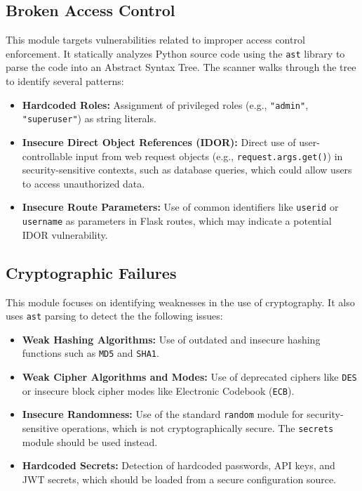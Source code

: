 \subsection{Broken Access Control}
This module targets vulnerabilities related to improper access control enforcement. It statically analyzes Python source code using the \texttt{ast} library to parse the code into an Abstract Syntax Tree. The scanner walks through the tree to identify several patterns:
\begin{itemize}
    \item \textbf{Hardcoded Roles:} Assignment of privileged roles (e.g., \texttt{"admin"}, \texttt{"superuser"}) as string literals.
    \item \textbf{Insecure Direct Object References (IDOR):} Direct use of user-controllable input from web request objects (e.g., \texttt{request.args.get()}) in security-sensitive contexts, such as database queries, which could allow users to access unauthorized data.
    \item \textbf{Insecure Route Parameters:} Use of common identifiers like \texttt{userid} or \texttt{username} as parameters in Flask routes, which may indicate a potential IDOR vulnerability.
\end{itemize}

\subsection{Cryptographic Failures}
This module focuses on identifying weaknesses in the use of cryptography. It also uses \texttt{ast} parsing to detect the the following issues:
\begin{itemize}
    \item \textbf{Weak Hashing Algorithms:} Use of outdated and insecure hashing functions such as \texttt{MD5} and \texttt{SHA1}.
    \item \textbf{Weak Cipher Algorithms and Modes:} Use of deprecated ciphers like \texttt{DES} or insecure block cipher modes like Electronic Codebook (\texttt{ECB}).
    \item \textbf{Insecure Randomness:} Use of the standard \texttt{random} module for security-sensitive operations, which is not cryptographically secure. The \texttt{secrets} module should be used instead.
    \item \textbf{Hardcoded Secrets:} Detection of hardcoded passwords, API keys, and JWT secrets, which should be loaded from a secure configuration source.
\end{itemize}

